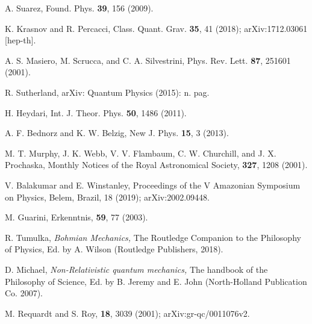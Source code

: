 \documentclass{article}
\begin{document}
\begin{thebibliography}{6}
A. Suarez,  Found. Phys. {\bf 39}, 156 (2009).

K. Krasnov and R. Percacci,  Class. Quant. Grav. {\bf35}, 41 (2018); arXiv:1712.03061 [hep-th].

A. S. Masiero, M. Scrucca, and C. A. Silvestrini,  Phys. Rev. Lett. {\bf 87}, 251601 (2001).

R. Sutherland,  arXiv: Quantum Physics (2015): n. pag.

 H. Heydari,  Int. J. Theor. Phys. {\bf50}, 1486 (2011).
 
A. F. Bednorz and K. W. Belzig,  New J. Phys. {\bf 15}, 3 (2013).

M. T. Murphy, J. K. Webb, V. V. Flambaum, C. W. Churchill, and J. X. Prochaska,  Monthly Notices of the Royal Astronomical Society, {\bf 327}, 1208 (2001).

V. Balakumar and E. Winstanley,  Proceedings of the V Amazonian Symposium on Physics, Belem, Brazil, 18 (2019); arXiv:2002.09448.

M. Guarini,  Erkenntnis, {\bf 59}, 77 (2003).

R. Tumulka, {\it Bohmian Mechanics,} The Routledge Companion to the Philosophy of Physics, Ed. by A. Wilson  (Routledge Publishers, 2018).

D. Michael, {\it Non-Relativistic quantum mechanics,} The handbook of the Philosophy of Science, Ed. by B. Jeremy and E. John (North-Holland Publication Co. 2007). 

M. Requardt and S. Roy,  {\bf 18}, 3039 (2001); arXiv:gr-qc/0011076v2.


\end{thebibliography}
\end{document}
